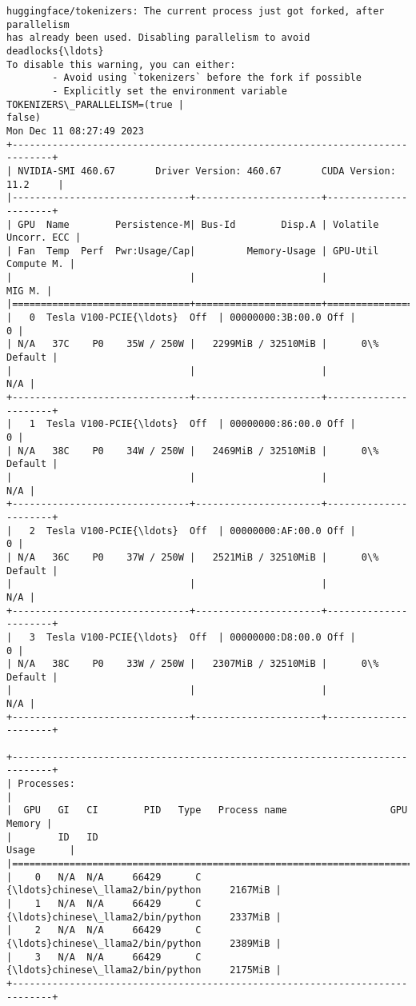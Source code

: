 \documentclass[11pt]{article}
\begin{document}
    \begin{Verbatim}[commandchars=\\\{\}]
huggingface/tokenizers: The current process just got forked, after parallelism
has already been used. Disabling parallelism to avoid deadlocks{\ldots}
To disable this warning, you can either:
        - Avoid using `tokenizers` before the fork if possible
        - Explicitly set the environment variable TOKENIZERS\_PARALLELISM=(true |
false)
Mon Dec 11 08:27:49 2023
+-----------------------------------------------------------------------------+
| NVIDIA-SMI 460.67       Driver Version: 460.67       CUDA Version: 11.2     |
|-------------------------------+----------------------+----------------------+
| GPU  Name        Persistence-M| Bus-Id        Disp.A | Volatile Uncorr. ECC |
| Fan  Temp  Perf  Pwr:Usage/Cap|         Memory-Usage | GPU-Util  Compute M. |
|                               |                      |               MIG M. |
|===============================+======================+======================|
|   0  Tesla V100-PCIE{\ldots}  Off  | 00000000:3B:00.0 Off |                    0 |
| N/A   37C    P0    35W / 250W |   2299MiB / 32510MiB |      0\%      Default |
|                               |                      |                  N/A |
+-------------------------------+----------------------+----------------------+
|   1  Tesla V100-PCIE{\ldots}  Off  | 00000000:86:00.0 Off |                    0 |
| N/A   38C    P0    34W / 250W |   2469MiB / 32510MiB |      0\%      Default |
|                               |                      |                  N/A |
+-------------------------------+----------------------+----------------------+
|   2  Tesla V100-PCIE{\ldots}  Off  | 00000000:AF:00.0 Off |                    0 |
| N/A   36C    P0    37W / 250W |   2521MiB / 32510MiB |      0\%      Default |
|                               |                      |                  N/A |
+-------------------------------+----------------------+----------------------+
|   3  Tesla V100-PCIE{\ldots}  Off  | 00000000:D8:00.0 Off |                    0 |
| N/A   38C    P0    33W / 250W |   2307MiB / 32510MiB |      0\%      Default |
|                               |                      |                  N/A |
+-------------------------------+----------------------+----------------------+

+-----------------------------------------------------------------------------+
| Processes:                                                                  |
|  GPU   GI   CI        PID   Type   Process name                  GPU Memory |
|        ID   ID                                                   Usage      |
|=============================================================================|
|    0   N/A  N/A     66429      C   {\ldots}chinese\_llama2/bin/python     2167MiB |
|    1   N/A  N/A     66429      C   {\ldots}chinese\_llama2/bin/python     2337MiB |
|    2   N/A  N/A     66429      C   {\ldots}chinese\_llama2/bin/python     2389MiB |
|    3   N/A  N/A     66429      C   {\ldots}chinese\_llama2/bin/python     2175MiB |
+-----------------------------------------------------------------------------+
    \end{Verbatim}
\end{document}
